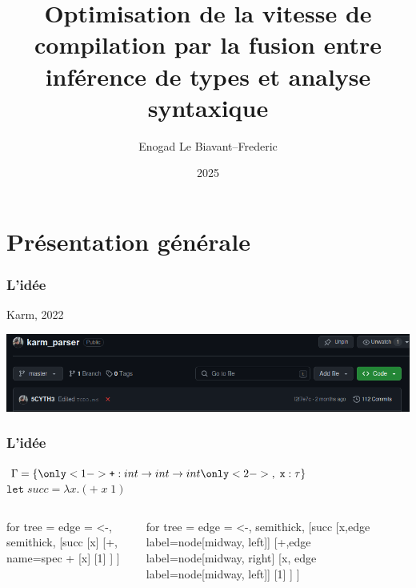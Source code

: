\documentclass{beamer}
\title{Optimisation de la vitesse de compilation par la fusion entre inférence de types et analyse syntaxique}
\author{Enogad Le Biavant--Frederic}
\institute{Alain René Lesage MPI}
\date{2025}
\begin{document}
\frame{\titlepage}

\section{Présentation générale}
\begin{frame}
		\frametitle{L'idée}
		Karm, 2022
		\begin{center}
				\includegraphics[scale=0.25]{repo}
		\end{center}
		
\end{frame}

\begin{frame}[fragile]
		\frametitle{L'idée}

		$\Gamma = \{ 
				\only<1->{\texttt +: int \rightarrow int \rightarrow int}
				\only<2->{,\; \texttt x: \tau}
		\}$
		\\
		$\texttt{let} \; succ = \lambda x.(+ \; x \; 1)$
		
		\begin{columns}
				\begin{column}{0.5\textwidth}
						\begin{center}
						\begin{forest}
								for tree = {
										edge = {<-, semithick},
								}
								[succ
										[x]
										[+, name=spec +
												[x]
												[1]	
										]
								]
						\end{forest}
						\end{center}
				\end{column}
				\begin{column}{0.5\textwidth}
						\begin{center}
						\begin{forest}
								for tree = {
										edge = {<-, semithick},
								}
								[succ
								[x,edge label={node[midway, left]{\only<1->{$\{x:\tau\}$}}}]
										[+,edge label={node[midway, right]{\only<3->{$\{\tau = int\}$}}}
												[x, edge label={node[midway, left]{\only<2->{$\{x:\tau\}$}}}]
												[1]	
										]
								]
						\end{forest}
						\end{center}
				\end{column}
		\end{columns}
\end{frame}
\end{document}
